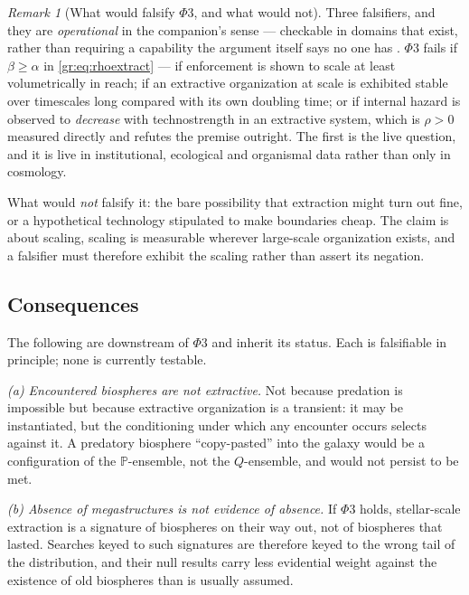 \documentclass[11pt]{article}
\numberwithin{equation}{section}
\theoremstyle{plain}
\theoremstyle{definition}
\theoremstyle{remark}
\newtheorem{remark}[theorem]{Remark}
\newcommand{\PP}{\mathbb{P}}
\begin{document}
\begin{remark}[What would falsify $\Phi3$, and what would not]
\label{gr:rem:falsify}
Three falsifiers, and they are \emph{operational} in the companion's
sense --- checkable in domains that exist, rather than requiring a
capability the argument itself says no one has \cite{Ben26Optimal}.
$\Phi3$ fails if $\beta\ge\alpha$ in \eqref{gr:eq:rhoextract} --- if
enforcement is shown to scale at least volumetrically in reach; if an
extractive organization at scale is exhibited stable over timescales
long compared with its own doubling time; or if internal hazard is
observed to \emph{decrease} with technostrength in an extractive system,
which is $\rho>0$ measured directly and refutes the premise outright. The first
is the live question, and it is live in institutional, ecological and
organismal data rather than only in cosmology.

What would \emph{not} falsify it: the bare possibility that extraction
might turn out fine, or a hypothetical technology stipulated to make
boundaries cheap. The claim is about scaling, scaling is measurable
wherever large-scale organization exists, and a falsifier must therefore
exhibit the scaling rather than assert its negation.
\end{remark}

\subsection{Consequences}\label{gr:sub:consequences}

The following are downstream of $\Phi3$ and inherit its status. Each is
falsifiable in principle; none is currently testable.

\emph{(a) Encountered biospheres are not extractive.} Not because
predation is impossible but because extractive organization is a
transient: it may be instantiated, but the conditioning under which any
encounter occurs selects against it. A predatory biosphere
``copy-pasted'' into the galaxy would be a configuration of the
$\PP$-ensemble, not the $Q$-ensemble, and would not persist to be met.

\emph{(b) Absence of megastructures is not evidence of absence.} If
$\Phi3$ holds, stellar-scale extraction is a signature of biospheres on
their way out, not of biospheres that lasted. Searches keyed to such
signatures \cite{Dys60} are therefore keyed to the wrong tail of the
distribution, and their null results carry less evidential weight
against the existence of old biospheres than is usually assumed.
\end{document}

